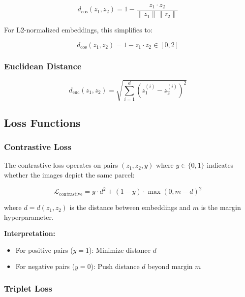 \documentclass[12pt,a4paper]{article}
\begin{document}
\begin{equation}
    d_{\cos}(z_1, z_2) = 1 - \frac{z_1 \cdot z_2}{\|z_1\| \|z_2\|}
\end{equation}

For L2-normalized embeddings, this simplifies to:

\begin{equation}
    d_{\cos}(z_1, z_2) = 1 - z_1 \cdot z_2 \in [0, 2]
\end{equation}

\subsubsection{Euclidean Distance}

\begin{equation}
    d_{\text{euc}}(z_1, z_2) = \sqrt{\sum_{i=1}^{d} (z_1^{(i)} - z_2^{(i)})^2}
\end{equation}

\subsection{Loss Functions}

\subsubsection{Contrastive Loss}

The contrastive loss operates on pairs $(z_1, z_2, y)$ where $y \in \{0, 1\}$ indicates whether the images depict the same parcel:

\begin{equation}
    \mathcal{L}_{\text{contrastive}} = y \cdot d^2 + (1-y) \cdot \max(0, m - d)^2
\end{equation}

where $d = d(z_1, z_2)$ is the distance between embeddings and $m$ is the margin hyperparameter.

\textbf{Interpretation:}
\begin{itemize}
    \item For positive pairs ($y=1$): Minimize distance $d$
    \item For negative pairs ($y=0$): Push distance $d$ beyond margin $m$
\end{itemize}

\subsubsection{Triplet Loss}
\end{document}
